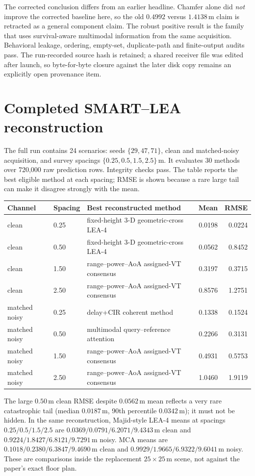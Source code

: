 \documentclass[10pt,a4paper]{article}
\newcommand{\m}{\,\mathrm{m}}
\begin{document}
The corrected conclusion differs from an earlier headline. Chamfer alone did \emph{not} improve the corrected baseline here, so the old $0.4992$ versus $1.4138\m$ claim is retracted as a general component claim. The robust positive result is the family that uses survival-aware multimodal information from the same acquisition. Behavioral leakage, ordering, empty-set, duplicate-path and finite-output audits pass. The run-recorded source hash is retained; a shared receiver file was edited after launch, so byte-for-byte closure against the later disk copy remains an explicitly open provenance item.

\section{Completed SMART--LEA reconstruction}
The full run contains 24 scenarios: seeds $\{29,47,71\}$, clean and matched-noisy acquisition, and survey spacings $\{0.25,0.5,1.5,2.5\}\m$. It evaluates 30 methods over 720,000 raw prediction rows. Integrity checks pass. The table reports the best eligible method at each spacing; RMSE is shown because a rare large tail can make it disagree strongly with the mean.

\begin{center}\small
\begin{tabularx}{\linewidth}{@{}llXrr@{}}\toprule
Channel&Spacing&Best reconstructed method&Mean&RMSE\\\midrule
clean&0.25&fixed-height 3-D geometric-cross LEA-4&0.0198&0.0224\\
clean&0.50&fixed-height 3-D geometric-cross LEA-4&0.0562&0.8452\\
clean&1.50&range--power--AoA assigned-VT consensus&0.3197&0.3715\\
clean&2.50&range--power--AoA assigned-VT consensus&0.8576&1.2751\\
matched noisy&0.25&delay+CIR coherent method&0.1338&0.1524\\
matched noisy&0.50&multimodal query--reference attention&0.2266&0.3131\\
matched noisy&1.50&range--power--AoA assigned-VT consensus&0.4931&0.5753\\
matched noisy&2.50&range--power--AoA assigned-VT consensus&1.0460&1.9119\\\bottomrule
\end{tabularx}
\end{center}

The large $0.50\m$ clean RMSE despite $0.0562\m$ mean reflects a very rare catastrophic tail (median $0.0187\m$, 90th percentile $0.0342\m$); it must not be hidden. In the same reconstruction, Majid-style LEA-4 means at spacings $0.25/0.5/1.5/2.5$ are $0.0369/0.0791/6.2071/9.4343\m$ clean and $0.9224/1.8427/6.8121/9.7291\m$ noisy. MCA means are $0.1018/0.2380/6.3847/9.4690\m$ clean and $0.9929/1.9665/6.9322/9.6041\m$ noisy. These are comparisons inside the replacement $25\times25\m$ scene, not against the paper's exact floor plan.
\end{document}
